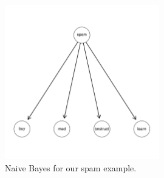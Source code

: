 \documentclass{article}\usepackage[]{graphicx}\usepackage[]{color}
\begin{document}
\begin{figure}
  \begin{center}
    \includegraphics[width=0.6\textwidth]{nb.pdf}
    \caption{Naive Bayes for our spam example.}
    \label{fig:nb}
  \end{center}
\end{figure}




\end{document}
